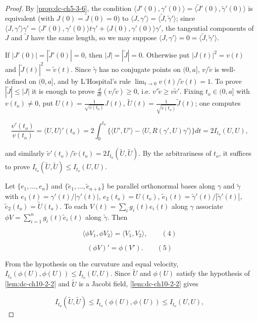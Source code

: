 \begin{proof}
  By \cref{prop:dc-ch5-3-6}, the condition
  $\langle J'(0),\gamma'(0)\rangle=\langle\tilde J'(0),\tilde\gamma'(0)\rangle$ is
  equivalent (with $J(0)=\tilde J(0)=0$) to $\langle J,\gamma'\rangle=\langle\tilde J,\tilde\gamma'\rangle$;
  since $\langle J,\gamma'\rangle\gamma'=\langle J'(0),\gamma'(0)\rangle t\gamma'+\langle J(0),\gamma'(0)\rangle\gamma'$,
  the tangential components of $J$ and $\tilde J$ have the same length, so we may
  suppose $\langle J,\gamma'\rangle=0=\langle\tilde J,\tilde\gamma'\rangle$.
  
  If $|J'(0)|=|\tilde J'(0)|=0$, then $|J|=|\tilde J|=0$. Otherwise put
  $|J(t)|^2=v(t)$ and $|\tilde J(t)|^2=\tilde v(t)$. Since $\tilde\gamma$ has no
  conjugate points on $(0,a]$, $v/\tilde v$ is well-defined on $(0,a]$, and by
  L'Hospital's rule $\lim_{t\to 0}v(t)/\tilde v(t)=1$. To prove $|\tilde J|\leq|J|$
  it is enough to prove $\frac{d}{dt}(v/\tilde v)\geq 0$, i.e. $v'\tilde v\geq v\tilde v'$.
  Fixing $t_o\in(0,a]$ with $v(t_o)\neq 0$, put $U(t)=\frac{1}{\sqrt{v(t_o)}}J(t)$,
  $\tilde U(t)=\frac{1}{\sqrt{\tilde v(t_o)}}\tilde J(t)$; one computes
  
  $$
  \frac{v'(t_o)}{v(t_o)}=\langle U,U\rangle'(t_o)=2\int_0^{t_o}\{\langle U',U'\rangle-\langle U,R(\gamma',U)\gamma'\rangle\}dt=2I_{t_o}(U,U),
  $$
  
  and similarly $\tilde v'(t_o)/\tilde v(t_o)=2I_{t_o}(\tilde U,\tilde U)$. By the
  arbitrariness of $t_o$, it suffices to prove $I_{t_o}(\tilde U,\tilde U)\leq I_{t_o}(U,U)$.
  
  Let $\{e_1,\dots,e_n\}$ and $\{\tilde e_1,\dots,\tilde e_{n+k}\}$ be parallel
  orthonormal bases along $\gamma$ and $\tilde\gamma$ with $e_1(t)=\gamma'(t)/|\gamma'(t)|$,
  $e_2(t_o)=U(t_o)$, $\tilde e_1(t)=\tilde\gamma'(t)/|\tilde\gamma'(t)|$,
  $\tilde e_2(t_o)=\tilde U(t_o)$. To each $V(t)=\sum_i g_i(t)e_i(t)$ along $\gamma$
  associate $\phi V=\sum_{i=1}^n g_i(t)\tilde e_i(t)$ along $\tilde\gamma$. Then
  
  $$
  \langle\phi V_1,\phi V_2\rangle=\langle V_1,V_2\rangle,\qquad(4)
  $$
  
  $$
  (\phi V)'=\phi(V').\qquad(5)
  $$
  
  From the hypothesis on the curvature and equal velocity, $I_{t_o}(\phi(U),\phi(U))\leq I_{t_o}(U,U)$.
  Since $\tilde U$ and $\phi(U)$ satisfy the hypothesis of \cref{lem:dc-ch10-2-2} and $\tilde U$
  is a Jacobi field, \cref{lem:dc-ch10-2-2} gives
  
  $$
  I_{t_o}(\tilde U,\tilde U)\leq I_{t_o}(\phi(U),\phi(U))\leq I_{t_o}(U,U),
  $$
  

\end{proof}

